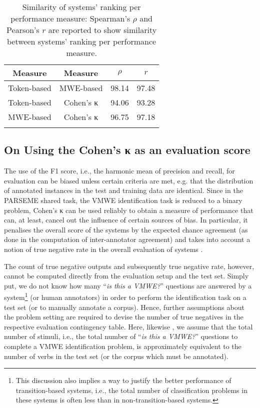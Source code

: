 \documentclass[output=paper,modfonts,nonflat,draftmode]{langsci/langscibook}
\begin{document}
\begin{table}
\centering
\caption{Similarity of systems' ranking per performance measure: Spearman's $\rho$ and Pearson's $r$ %
are reported to show similarity between systems' ranking per performance measure.}
\label{similarity-of-measures}
\begin{tabular}{cccc}%
\lsptoprule
Measure & Measure & $\rho$ & $r$ \tabularnewline
\midrule
Token-based & MWE-based        & 98.14 & 97.48 \tabularnewline
Token-based & Cohen's κ & 94.06 & 93.28 \tabularnewline
MWE-based   & Cohen's κ & 96.75 & 97.18 \tabularnewline
\lspbottomrule
\end{tabular}
\end{table}



\subsection{On Using the Cohen's κ as an evaluation score}

The use of the F1 score, i.e., the harmonic mean of precision and recall, for evaluation can be biased unless certain criteria are met, e.g. that the distribution of annotated instances in the test and training data are identical. Since in the PARSEME shared task, the VMWE identification task is reduced to a binary  problem, Cohen's κ can be used reliably to obtain a measure of performance that can, at least, cancel out the influence of certain sources of bias. In particular, it penalises the overall score of the systems by the expected chance agreement (as done in the computation of inter-annotator agreement) and takes into account a notion of true negative rate in the overall evaluation of systems \citep{Powers2012,Powers15}. 

\largerpage
The count of true negative outputs and subsequently true negative rate, however, cannot be computed directly from the evaluation setup and the test set. Simply put, we do not know how many ``\emph{is this a VMWE?}'' questions are answered by a system\footnote{This discussion also implies a way to justify the better performance of transition-based systems, i.e., the total number of classification problems in these systems is often less than in non-transition-based systems.} (or human annotators) in order to perform the identification task on a test set (or to manually annotate a corpus). Hence, further assumptions about the problem setting are required to devise the number of true negatives in the respective evaluation contingency table. Here, likewise \citep{MWEWorkshop}, we assume that the total number of stimuli, i.e., the total number of ``\emph{is this a VMWE?}'' questions to complete a VMWE identification problem, is approximately equivalent to the number of verbs in the test set (or the corpus which must be annotated).
\end{document}

